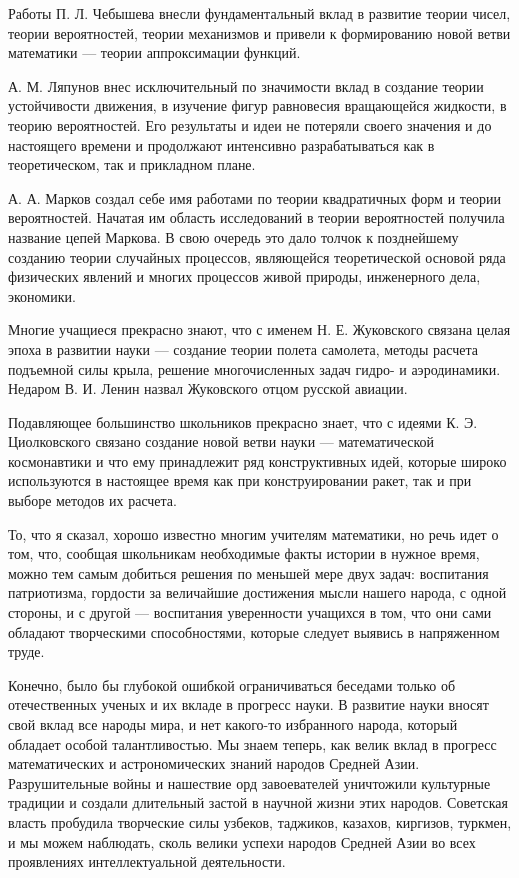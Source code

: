 \documentclass[12pt, a4paper, openany]{book}
\begin{document}
Работы П. Л. Чебышева внесли фундаментальный вклад в развитие теории чисел, теории вероятностей, теории  механизмов и привели к формированию новой ветви  математики — теории аппроксимации функций. 
 
А. М. Ляпунов внес исключительный по значимости вклад в создание теории устойчивости движения, в изучение фигур равновесия вращающейся жидкости, в теорию  вероятностей. Его результаты и идеи не потеряли своего  значения и до настоящего времени и продолжают интенсивно разрабатываться как в теоретическом, так и прикладном плане. 

А. А. Марков создал себе имя работами по теории  квадратичных форм и теории вероятностей. Начатая им область исследований в теории вероятностей получила название цепей Маркова. В свою очередь это дало толчок к  позднейшему созданию теории случайных процессов,  являющейся теоретической основой ряда физических явлений и многих процессов живой природы, инженерного дела, экономики. 

Многие учащиеся прекрасно знают, что с именем Н. Е. Жуковского связана целая эпоха в развитии науки — создание теории полета самолета, методы расчета  подъемной силы крыла, решение многочисленных задач гидро- и аэродинамики. Недаром В. И. Ленин назвал Жуковского отцом русской авиации. 

Подавляющее большинство школьников прекрасно знает, что с идеями К. Э. Циолковского связано создание новой ветви науки — математической космонавтики и что ему принадлежит ряд конструктивных идей, которые  широко используются в настоящее время как при  конструировании ракет, так и при выборе методов их расчета. 

То, что я сказал, хорошо известно многим учителям  математики, но речь идет о том, что, сообщая школьникам необходимые факты истории в нужное время, можно тем самым добиться решения по меньшей мере двух задач: воспитания патриотизма, гордости за величайшие  достижения мысли нашего народа, с одной стороны, и с другой — воспитания уверенности учащихся в том, что они сами  обладают творческими способностями, которые следует  выявись в напряженном труде. 

Конечно, было бы глубокой ошибкой ограничиваться беседами только об отечественных ученых и их вкладе в прогресс науки. В развитие науки вносят свой вклад все народы мира, и нет какого-то избранного народа, который обладает особой талантливостью. Мы знаем теперь, как велик вклад в прогресс математических и  астрономических знаний народов Средней Азии. Разрушительные войны и нашествие орд завоевателей уничтожили культурные традиции и создали длительный застой в научной  жизни этих народов. Советская власть пробудила творческие силы узбеков, таджиков, казахов, киргизов, туркмен, и мы можем наблюдать, сколь велики успехи народов Средней Азии во всех проявлениях интеллектуальной деятельности. 
\end{document}
